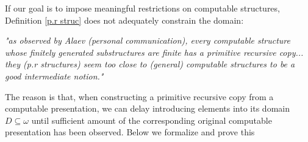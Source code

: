 \documentclass{pracalicmgr2025}
\theoremstyle{plain}            %
\theoremstyle{remark}           %
\theoremstyle{definition}       %
\begin{document}
 If our goal is to impose meaningful restrictions on computable structures, Definition \ref{p.r struc} does not adequately constrain the domain:
\begin{center}
    \emph{"as observed by Alaev (personal communication), every computable structure whose finitely generated substructures are finite has a primitive recursive copy... they (p.r structures) seem too close to (general) computable structures to be a good intermediate notion."}\cite{3}
\end{center}


The reason is that, when constructing a primitive recursive copy from a computable presentation, we can delay introducing elements into its domain $D \subseteq \omega$ until sufficient amount of the corresponding original computable presentation has been observed. Below we formalize and prove this
\end{document}
